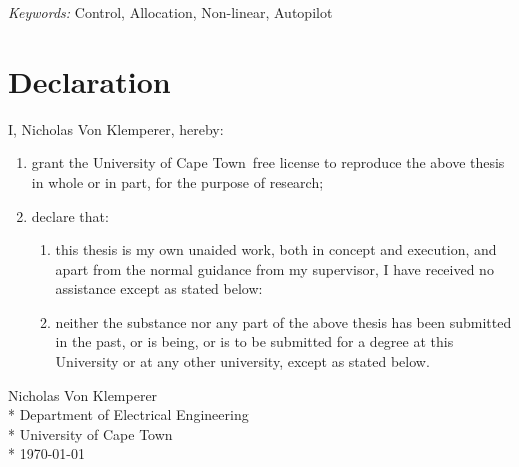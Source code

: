 \documentclass[a4paper, 11pt, oneside, openright, parskip=full]{book}
\newcommand{\auth}{Nicholas Von Klemperer}								%
\newcommand{\dept}{Department of Electrical Engineering}%
\newcommand{\uni}{University of Cape Town}				%
\newcommand{\key}{Control, Allocation, Non-linear, Autopilot}					   %
\newcommand*{\signature}[1]
{
	\par\noindent\makebox [5cm]{\hrulefill}
	\par\noindent\makebox [5cm][1]{#1}
}
\begin{document}
\begin{titlepage}
		\vskip 15mm	
	\begin{normalsize}				
		{\itshape Keywords:}
		\key			
	\end{normalsize}	
\end{titlepage}

\frontmatter
\chapter{Declaration}				
\label{ch:decl}
I, \auth,  hereby:

\begin{enumerate}
	\item		grant the \uni\  free license to reproduce the above thesis in whole or in part, for the purpose of research;
	\item		declare that:
	
	\begin{enumerate}
		\item		this thesis is my own unaided work, both in concept and execution, and apart from the normal guidance from my supervisor, I have received no assistance except as stated below:
		\item		neither the substance nor any part of the above thesis has been submitted in the past, or is being, or is to be submitted for a degree at this University or at any other university, except as stated below.
	\end{enumerate}	
\end{enumerate}

\begin{flushright}	%
	\vskip 6cm
	\noindent \signature{x}
	\noindent \auth \\*
	\vskip 2mm
	\noindent \dept \\*
	\noindent \uni \\*
	\vskip 2mm
	\noindent \today
\end{flushright}

\end{document}
